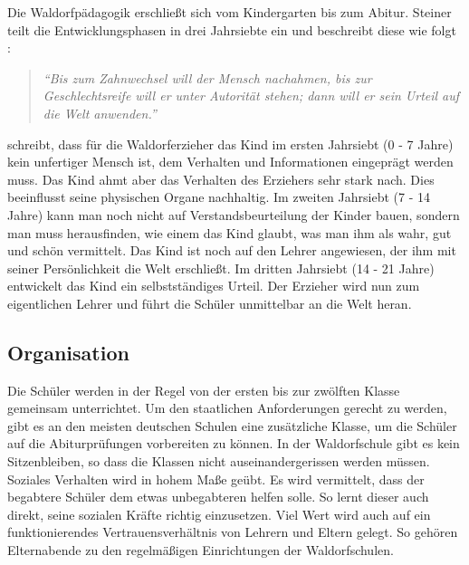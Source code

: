 Die Waldorfpädagogik erschließt sich vom Kindergarten bis zum Abitur. Steiner teilt die Entwicklungsphasen in drei Jahrsiebte ein und beschreibt diese wie folgt \citep[S. 139]{steiner10}:

\begin{quotation}
			\emph{\enquote{Bis zum Zahnwechsel will der Mensch nachahmen, bis zur Geschlechtsreife will er unter Autorität stehen; dann will er sein Urteil auf die Welt anwenden.}}
\end{quotation}

\citet{kiersch07} schreibt, dass für die Waldorferzieher das Kind im ersten Jahrsiebt (0 - 7 Jahre) kein unfertiger Mensch ist, dem Verhalten und Informationen eingeprägt werden muss. Das Kind ahmt aber das Verhalten des Erziehers sehr stark nach. Dies beeinflusst seine physischen Organe nachhaltig. Im zweiten Jahrsiebt (7 - 14 Jahre) kann man noch nicht auf Verstandsbeurteilung der Kinder bauen, sondern man muss herausfinden, wie einem das Kind glaubt, was man ihm als wahr, gut und schön vermittelt. Das Kind ist noch auf den Lehrer angewiesen, der ihm mit seiner Persönlichkeit die Welt erschließt. Im dritten Jahrsiebt (14 - 21 Jahre) entwickelt das Kind ein selbstständiges Urteil. Der Erzieher wird nun zum eigentlichen Lehrer und führt die Schüler unmittelbar an die Welt heran. 

\subsection{Organisation} %
\label{sub:organisation}

Die Schüler werden in der Regel von der ersten bis zur zwölften Klasse gemeinsam unterrichtet. Um den staatlichen Anforderungen gerecht zu werden, gibt es an den meisten deutschen Schulen eine zusätzliche Klasse, um die Schüler auf die Abiturprüfungen vorbereiten zu können. In der Waldorfschule gibt es kein Sitzenbleiben, so dass die Klassen nicht auseinandergerissen werden müssen. Soziales Verhalten wird in hohem Maße geübt. Es wird vermittelt, dass der begabtere Schüler dem etwas unbegabteren helfen solle. So lernt dieser auch direkt, seine sozialen Kräfte richtig einzusetzen. Viel Wert wird auch auf ein funktionierendes Vertrauensverhältnis von Lehrern und Eltern gelegt. So gehören Elternabende zu den regelmäßigen Einrichtungen der Waldorfschulen. \citep[Vgl.][]{kiersch07, hemleben63}

